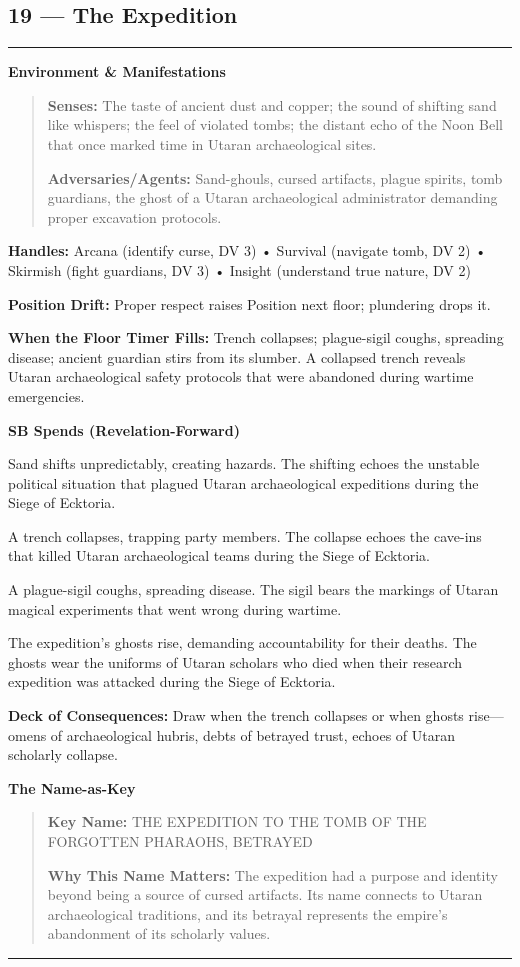 \documentclass[18pt, letterpaper, twoside]{article}
\newenvironment{floorbox}[1]{%
    \begin{center}
    \begin{minipage}{0.95\textwidth}
    \subsection*{#1}
    \vspace{-0.5em}
    \rule{\textwidth}{0.5pt}
    \vspace{0.5em}
}{%
    \vspace{0.5em}
    \rule{\textwidth}{0.5pt}
    \end{minipage}
    \end{center}
}
\newenvironment{gmnote}[1]{%
    \vspace{0.5em}
    \noindent\textbf{#1}
    \begin{quote}
}{%
    \end{quote}
    \vspace{0.5em}
}
\newcommand{\handles}[1]{\noindent\textbf{Handles:} #1\par}
\newcommand{\sbitem}[2]{\item[#1 SB:] #2}
\newcommand{\deckdraw}[1]{\noindent\textbf{Deck of Consequences:} #1\par}
\newcommand{\keyname}[1]{\noindent\textbf{Key Name:} #1\par}
\newcommand{\nameimportance}[1]{\noindent\textbf{Why This Name Matters:} #1\par}
\begin{document}
\begin{floorbox}{19 --- The Expedition}
\begin{gmnote}{Environment \& Manifestations}
\textbf{Senses:} The taste of ancient dust and copper; the sound of shifting sand like whispers; the feel of violated tombs; the distant echo of the Noon Bell that once marked time in Utaran archaeological sites.

\textbf{Adversaries/Agents:} Sand-ghouls, cursed artifacts, plague spirits, tomb guardians, the ghost of a Utaran archaeological administrator demanding proper excavation protocols.
\end{gmnote}

\handles{Arcana (identify curse, DV 3) • Survival (navigate tomb, DV 2) • Skirmish (fight guardians, DV 3) • Insight (understand true nature, DV 2)}

\textbf{Position Drift:} Proper respect raises Position next floor; plundering drops it.

\textbf{When the Floor Timer Fills:} Trench collapses; plague-sigil coughs, spreading disease; ancient guardian stirs from its slumber. A collapsed trench reveals Utaran archaeological safety protocols that were abandoned during wartime emergencies.

\textbf{SB Spends (Revelation-Forward)}
\begin{description}[leftmargin=*, style=unboxed]
    \sbitem{1}{Sand shifts unpredictably, creating hazards. The shifting echoes the unstable political situation that plagued Utaran archaeological expeditions during the Siege of Ecktoria.}
    \sbitem{2}{A trench collapses, trapping party members. The collapse echoes the cave-ins that killed Utaran archaeological teams during the Siege of Ecktoria.}
    \sbitem{3}{A plague-sigil coughs, spreading disease. The sigil bears the markings of Utaran magical experiments that went wrong during wartime.}
    \sbitem{4+}{The expedition's ghosts rise, demanding accountability for their deaths. The ghosts wear the uniforms of Utaran scholars who died when their research expedition was attacked during the Siege of Ecktoria.}
\end{description}

\deckdraw{Draw when the trench collapses or when ghosts rise---omens of archaeological hubris, debts of betrayed trust, echoes of Utaran scholarly collapse.}

\begin{gmnote}{The Name-as-Key}
\keyname{THE EXPEDITION TO THE TOMB OF THE FORGOTTEN PHARAOHS, BETRAYED}
\nameimportance{The expedition had a purpose and identity beyond being a source of cursed artifacts. Its name connects to Utaran archaeological traditions, and its betrayal represents the empire's abandonment of its scholarly values.}


\end{gmnote}
\end{floorbox}
\end{document}
